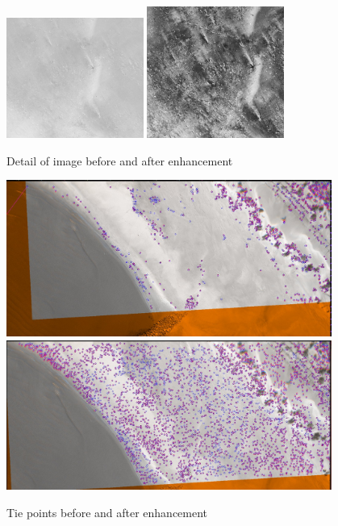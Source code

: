 \begin{figure}
\begin{center}
\includegraphics[width=0.4\textwidth]{FIGS/Tapioca-SFS/Detail-STD.jpg}
\includegraphics[width=0.4\textwidth]{FIGS/Tapioca-SFS/Detail-SFS.jpg}
\end{center}
\caption{Detail of image before and after enhancement}
\label{FIG:SF:Det}
\end{figure}


\begin{figure}
\begin{center}
\includegraphics[width=0.95\textwidth]{FIGS/Tapioca-SFS/SIFT-STD.jpg}
\includegraphics[width=0.95\textwidth]{FIGS/Tapioca-SFS/SIFT-SFS.jpg}
\end{center}
\caption{Tie points before and after enhancement}
\label{FIG:SF:TieP}
\end{figure}


